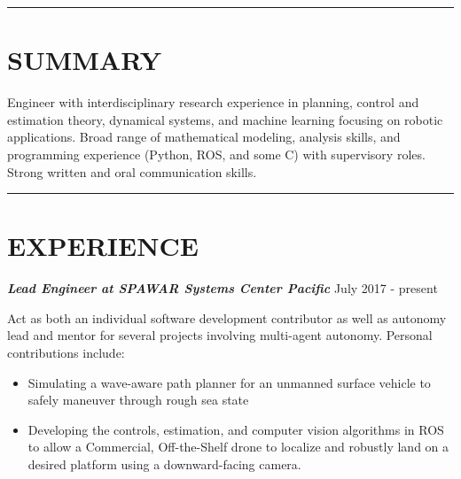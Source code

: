 \documentclass{res}
\begin{document}

 
\begin{resume}

%
%

 \vspace*{-2ex}
\hspace{-8.5ex}\rule{16.5cm}{0.4pt}
 \vspace*{-3ex}
\section{SUMMARY}
\vspace{1ex}
Engineer with interdisciplinary research experience in planning, control and estimation theory, dynamical systems, and machine learning focusing on robotic applications.  Broad range of mathematical modeling, analysis skills, and programming experience (Python, ROS, and some C) with supervisory roles. Strong written and oral communication skills.

 \vspace*{-4ex}
\hspace{-8.5ex}\rule{16.5cm}{0.4pt}
 \vspace*{-3ex}
\section{EXPERIENCE}
{\sl \bf Lead Engineer at SPAWAR Systems Center Pacific} \hfill July 2017 - present

\vspace*{-2ex}
 Act as both an individual software development contributor as well as autonomy lead and mentor for several projects involving multi-agent autonomy.  Personal contributions include: 
\begin{itemize}
\item Simulating a wave-aware path planner for an unmanned surface vehicle to safely maneuver through rough sea state
\item Developing the controls, estimation, and computer vision algorithms in ROS to allow a Commercial, Off-the-Shelf drone to localize and robustly land on a desired platform using a downward-facing camera.


\end{itemize}
\end{resume}
\end{document}

